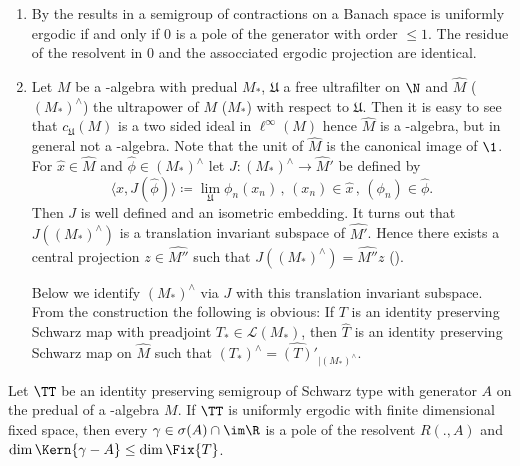 \begin{remarks}\label{rem:d3-2.4}
\begin{enumerate}[\upshape (i), wide, labelindent=.25em]
\item
By the results in \textcite{lin:1974} a semigroup of contractions on a Banach space is uniformly ergodic if and only if\/ $0$ is a pole of the generator with order $\leq 1$.
The residue of the resolvent in $0$ and the assocciated ergodic projection are identical.

\item
Let $M$ be a \WA-algebra with predual $M_{*}$, $\mathfrak{U}$ a free ultrafilter on $\N $ and $\widehat{M}$ (\resp  $(M_{*})^{\wedge}$) the ultrapower of\/ $M$ (\resp  $M_{*}$) with respect to $\mathfrak{U}$.
Then it is easy to see that $c_{\mathfrak{U}}(M)$ is a two sided ideal in $\ell^{\infty}(M)$ hence $\widehat{M}$ is a \CA-algebra, but in general not a \WA-algebra.
Note that the unit of\/ $\widehat{M}$ is the canonical image of\/ $\1$.
For $\widehat{x} \in \widehat{M}$ and $\widehat{\phi} \in (M_{*})^{\wedge}$ let $J: (M_{*})^{\wedge} \to \widehat{M}'$ be defined by
\[
\langle x,J(\widehat{\phi}) \rangle \coloneqq \lim_{\mathfrak{U}}\phi_{n}(x_{n}) \, , \, (x_{n}) \in \widehat{x} \, , \, (\phi_{n}) \in \widehat{\phi} .
\]
Then $J$ is well defined and an isometric embedding.
It turns out that $J((M_{*})^{\wedge})$ is a translation invariant subspace of\/ $\widehat{M'}$.
Hence there exists a central projection $z \in \widehat{M''}$ such that $J((M_{*})^{\wedge}) = \widehat{M''}z$ (\textcite[Proposition 2.2]{groh:1984b}).

Below we identify $(M_{*})^{\wedge}$ via $J$ with this translation invariant subspace.
From the construction the following is obvious: If\/ $T$ is an identity preserving Schwarz map with preadjoint $T_{*} \in \mathcal{L}(M_{*})$, then $\widehat{T}$ is an identity preserving Schwarz map on $\widehat{M}$ such that $(T_{*})^{\wedge} = \widehat{(T)}{}'_{\vert (M_{*})^{\wedge}}$.
\end{enumerate}
\end{remarks}
\begin{theorem}\label{thm:d3-2.5}
Let $\TT$ be an identity preserving semigroup of Schwarz type with generator $A$ on the predual of a \WA-algebra $M$.
If\/ $\TT$ is uniformly ergodic with finite dimensional fixed space, then every $\gamma \in \sigma(A) \cap \im\R$ is a pole of the resolvent $R(.,A)$ and $\dim \Kern{\gamma - A} \leq \dim \Fix{T}$.
\end{theorem}
